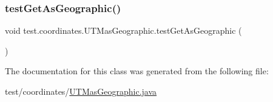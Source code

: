 \subsubsection{\texorpdfstring{test\+Get\+As\+Geographic()}{testGetAsGeographic()}}
{\footnotesize\ttfamily void test.\+coordinates.\+U\+T\+Mas\+Geographic.\+test\+Get\+As\+Geographic (\begin{DoxyParamCaption}{ }\end{DoxyParamCaption})}



The documentation for this class was generated from the following file\+:\begin{DoxyCompactItemize}
\item 
test/coordinates/\hyperlink{_u_t_mas_geographic_8java}{U\+T\+Mas\+Geographic.\+java}\end{DoxyCompactItemize}
